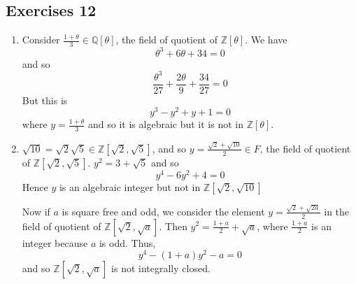 \subsection{Exercises 12}
\begin{enumerate}
\item Consider $\frac{1+\theta}{3} \in \mathbb{Q}[\theta]$, the field of quotient of $\mathbb{Z}[\theta]$. We have
      $$\theta^3+6\theta+34=0$$
      and so
      $$\frac{\theta^3}{27}+\frac{2\theta}{9}+\frac{34}{27}=0$$
      But this is
      $$y^3-y^2+y+1=0$$ where $y=\frac{1+\theta}{3}$ and so it is algebraic but it is not in $\mathbb{Z}[\theta]$.\\
\item $\sqrt{10}=\sqrt{2}\sqrt{5} \in \mathbb{Z}[\sqrt{2},\sqrt{5}]$, and so $y=\frac{\sqrt{2}+\sqrt{10}}{2} \in F$, the field of quotient of $\mathbb{Z}[\sqrt{2},\sqrt{5}]$. $y^2=3+\sqrt{5}$ and so
    $$y^4-6y^2+4=0$$ Hence $y$ is an algebraic integer but not in $\mathbb{Z}[\sqrt{2},\sqrt{10}]$

    Now if $a$ is square free and odd, we consider the element $y=\frac{\sqrt{2}+\sqrt{2a}}{2}$ in the field of quotient of $\mathbb{Z}[\sqrt{2},\sqrt{a}]$. Then $y^2=\frac{1+a}{2} + \sqrt{a}$, where $\frac{1+a}{2}$ is an integer because $a$ is odd. Thus,
    $$y^4-(1+a)y^2-a=0$$ and so $\mathbb{Z}[\sqrt{2},\sqrt{a}]$ is not integrally closed.


\end{enumerate}
